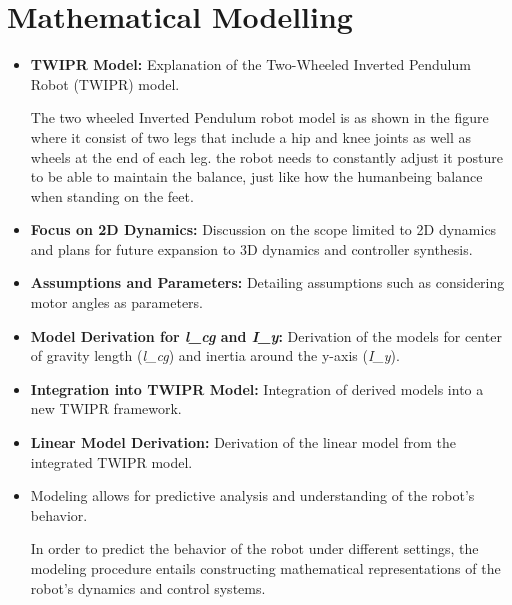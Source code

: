 \section{Mathematical Modelling}
\begin{itemize}
	\item \textbf{TWIPR Model:} Explanation of the Two-Wheeled Inverted Pendulum Robot (TWIPR) model.
	
	
	The two wheeled Inverted Pendulum robot model is as shown in the figure where it consist of two legs that include a hip and knee joints as well as wheels at the end of each leg.
	the robot needs to constantly adjust it posture to be able to maintain the balance, just like how the humanbeing balance when standing on the feet.
	
	\item \textbf{Focus on 2D Dynamics:} Discussion on the scope limited to 2D dynamics and plans for future expansion to 3D dynamics and controller synthesis.
	\item \textbf{Assumptions and Parameters:} Detailing assumptions such as considering motor angles as parameters.
	\item \textbf{Model Derivation for \textit{l\_cg} and \textit{I\_y}:} Derivation of the models for center of gravity length (\textit{l\_cg}) and inertia around the y-axis (\textit{I\_y}).
	\item \textbf{Integration into TWIPR Model:} Integration of derived models into a new TWIPR framework.
	\item \textbf{Linear Model Derivation:} Derivation of the linear model from the integrated TWIPR model.
	
	\item Modeling allows for predictive analysis and understanding of the robot's behavior.
	
	In order to predict the behavior of the robot under different settings, the modeling procedure entails constructing mathematical representations of the robot's dynamics and control systems.
\end{itemize}
	
%


